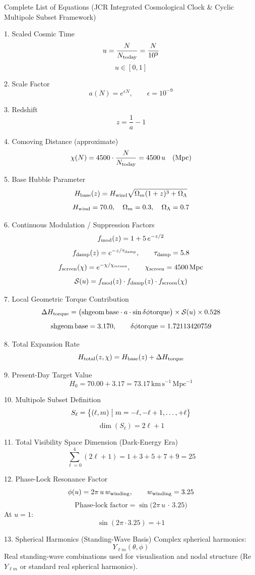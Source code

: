 Complete List of Equations  
(JCR Integrated Cosmological Clock & Cyclic Multipole Subset Framework)

1. Scaled Cosmic Time
\[
u = \frac{N}{N_{\rm today}} = \frac{N}{10^{9}}
\]
\[
u \in [0,1]
\]

2. Scale Factor
\[
a(N) = e^{\epsilon N}, \qquad \epsilon = 10^{-9}
\]

3. Redshift
\[
z = \frac{1}{a} - 1
\]

4. Comoving Distance (approximate)
\[
\chi(N) = 4500 \cdot \frac{N}{N_{\rm today}} = 4500\, u \quad (\rm Mpc)
\]

5. Base Hubble Parameter
\[
H_{\rm base}(z) = H_{\rm wind} \sqrt{\Omega_m (1+z)^3 + \Omega_\Lambda}
\]
\[
H_{\rm wind} = 70.0,\quad \Omega_m = 0.3,\quad \Omega_\Lambda = 0.7
\]

6. Continuous Modulation / Suppression Factors
\[
f_{\rm mod}(z) = 1 + 5\, e^{-z/2}
\]
\[
f_{\rm damp}(z) = e^{-z / \tau_{\rm damp}}, \qquad \tau_{\rm damp} = 5.8
\]
\[
f_{\rm screen}(\chi) = e^{-\chi / \chi_{\rm screen}}, \qquad \chi_{\rm screen} = 4500\,\rm Mpc
\]
\[
\mathcal{S}(u) = f_{\rm mod}(z) \cdot f_{\rm damp}(z) \cdot f_{\rm screen}(\chi)
\]

7. Local Geometric Torque Contribution
\[
\Delta H_{\rm torque} = \bigl( {\rm sh}{\rm geom\,base} \cdot a \cdot \sin\delta\phi{\rm torque} \bigr) \times \mathcal{S}(u) \times 0.528
\]
\[
{\rm sh}{\rm geom\,base} = 3.170, \qquad \delta\phi{\rm torque} = 1.72113420759
\]

8. Total Expansion Rate
\[
H_{\rm total}(z,\chi) = H_{\rm base}(z) + \Delta H_{\rm torque}
\]

9. Present-Day Target Value
\[
H_0 = 70.00 + 3.17 = 73.17\,\mathrm{km\,s^{-1}\,Mpc^{-1}}
\]

10. Multipole Subset Definition
\[
S_\ell = \bigl\{ (\ell,m) \bigm| m = -\ell,-\ell+1,\dots,+\ell \bigr\}
\]
\[
\dim(S_\ell) = 2\ell + 1
\]

11. Total Visibility Space Dimension (Dark-Energy Era)
\[
\sum_{\ell=0}^{4} (2\ell + 1) = 1 + 3 + 5 + 7 + 9 = 25
\]

12. Phase-Lock Resonance Factor
\[
\phi(u) = 2\pi \, u \, w_{\rm winding}, \qquad w_{\rm winding} = 3.25
\]
\[
\text{Phase-lock factor} = \sin\bigl(2\pi \, u \, \cdot \, 3.25\bigr)
\]
At \(u=1\):
\[
\sin(2\pi \cdot 3.25) = +1
\]

13. Spherical Harmonics (Standing-Wave Basis)
Complex spherical harmonics:
\[
Y_{\ell m}(\theta,\phi)
\]
Real standing-wave combinations used for visualisation and nodal structure (Re\(Y_{\ell m}\) or standard real spherical harmonics).

